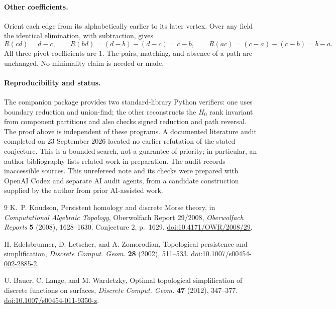 \documentclass[11pt]{article}
\begin{document}
\paragraph{Other coefficients.}
Orient each edge from its alphabetically earlier to its later vertex.
Over any field the identical elimination, with subtraction, gives
\[
 R(cd)=d-c,\qquad
 R(bd)=(d-b)-(d-c)=c-b,\qquad
 R(ac)=(c-a)-(c-b)=b-a.
\]
All three pivot coefficients are $1$. The pairs, matching, and absence of
a path are unchanged. No minimality claim is needed or made.

\paragraph{Reproducibility and status.}
The companion package provides two standard-library Python verifiers:
one uses boundary reduction and union-find; the other reconstructs the
$H_0$ rank invariant from component partitions and also checks signed
reduction and path reversal. The proof above is independent of these
programs. A documented literature audit completed on 23 September 2026
located no earlier refutation of the stated conjecture. This is a bounded
search, not a guarantee of priority; in particular, an author bibliography
lists related work in preparation. The audit records inaccessible sources.
This unrefereed note and its checks were prepared with OpenAI Codex and
separate AI audit agents, from a candidate construction supplied by the
author from prior AI-assisted work.

\begin{thebibliography}{9}
K.~P. Knudson, Persistent homology and discrete Morse theory,
in \emph{Computational Algebraic Topology}, Oberwolfach Report 29/2008,
\emph{Oberwolfach Reports} \textbf{5} (2008), 1628--1630.
Conjecture 2, p.~1629.
\href{https://doi.org/10.4171/OWR/2008/29}{doi:10.4171/OWR/2008/29}.

H. Edelsbrunner, D. Letscher, and A. Zomorodian,
Topological persistence and simplification,
\emph{Discrete Comput. Geom.} \textbf{28} (2002), 511--533.
\href{https://doi.org/10.1007/s00454-002-2885-2}{doi:10.1007/s00454-002-2885-2}.

U. Bauer, C. Lange, and M. Wardetzky,
Optimal topological simplification of discrete functions on surfaces,
\emph{Discrete Comput. Geom.} \textbf{47} (2012), 347--377.
\href{https://doi.org/10.1007/s00454-011-9350-z}{doi:10.1007/s00454-011-9350-z}.
\end{thebibliography}
\end{document}
